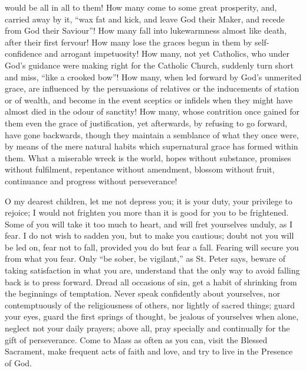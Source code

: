 would be all in all to them! How many come to some great prosperity,
and, carried away by it, ``wax fat and kick, and leave God their
Maker, and recede from God their Saviour''! How many fall into
lukewarmness almost like death, after their first fervour! How many
lose the graces begun in them by self-confidence and arrogant
impetuosity! How many, not yet Catholics, who under God's guidance
were making right for the Catholic Church, suddenly turn short and
miss, ``like a crooked bow''! How many, when led forward by
God's unmerited grace, are influenced by the persuasions of relatives
or the inducements of station or of wealth, and become in the event
sceptics or infidels when they might have almost died in the odour of
sanctity! How many, whose contrition once gained for them even the
grace of justification, yet afterwards, by refusing to go forward,
have gone backwards, though they maintain a semblance of what they
once were, by means of the mere natural habits which supernatural
grace has formed within them. What a miserable wreck is the world,
hopes without substance, promises without fulfilment, repentance
without amendment, blossom without fruit, continuance and progress
without perseverance!

O my dearest children, let me not depress you; it is your duty,
your privilege to rejoice; I would not frighten you more than it is
good for you to be frightened. Some of you will take it too much to
heart, and will fret yourselves unduly, as I fear. I do not wish to
sadden you, but to make you cautious; doubt not you will be led on,
fear not to fall, provided you do but fear a fall. Fearing will secure
you from what you fear. Only ``be sober, be vigilant,'' as St.
Peter says, beware of taking satisfaction in what you are, understand
that the only way to avoid falling back is to press forward. Dread all
occasions of sin, get a habit of shrinking from the beginnings of
temptation. Never speak confidently about yourselves, nor
contemptuously of the religiousness of others, nor lightly of sacred
things; guard your eyes, guard the first springs of thought, be
jealous of yourselves when alone, neglect not your daily prayers;
above all, pray specially and continually for the gift of
perseverance. Come to Mass as often as you can, visit the Blessed
Sacrament, make frequent acts of faith and love, and try to live in
the Presence of God.

